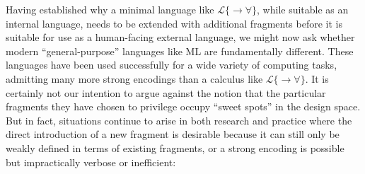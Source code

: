 \documentclass[9pt,preprint]{sigplanconf}
\begin{document}
Having established why a minimal language like $\mathcal{L}\{\rightarrow\forall\}$, while suitable as an internal language, needs to be extended with additional fragments before it is suitable for use as a human-facing external language, we might now ask whether modern ``general-purpose'' languages like ML are fundamentally different. These languages have been used successfully for a wide variety of computing tasks, admitting many more strong encodings than a  calculus like $\mathcal{L}\{\rightarrow \forall\}$. It is certainly not our intention to argue against the notion that the particular fragments they have chosen to privilege occupy ``sweet spots'' in the design space. But in fact, situations continue to arise in both research and practice where the direct introduction of a new fragment is desirable because it can still only be weakly defined in terms of existing fragments, or a strong encoding is possible but impractically verbose or inefficient:
\end{document}
